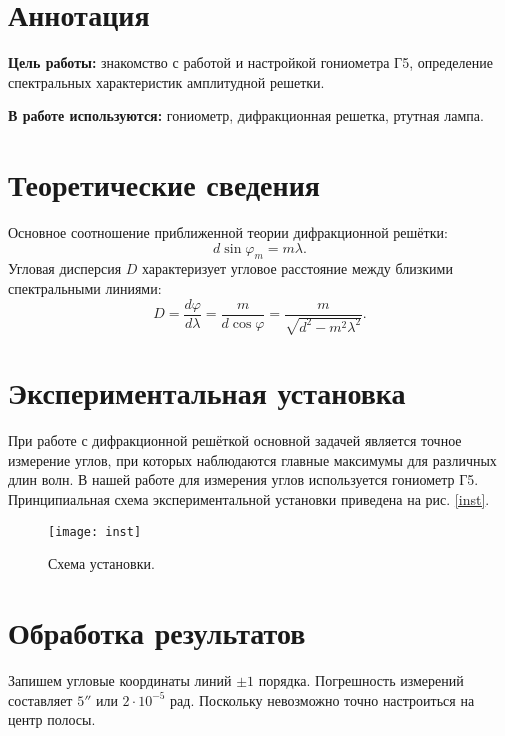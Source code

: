 






\section{Аннотация}
\textbf{Цель работы:} знакомство с работой и настройкой гониометра Г5, определение спектральных характеристик амплитудной решетки.

\textbf{В работе используются:}  гониометр, дифракционная решетка, ртутная лампа.
\section{Теоретические сведения}
\noindent Основное соотношение приближенной теории дифракционной решётки:
\begin{equation}
d\sin \varphi_m = m\lambda.
\end{equation}
Угловая дисперсия $D$ характеризует угловое расстояние между близкими спектральными линиями:
\begin{equation}
D = \frac{d\varphi}{d\lambda} = \frac{m}{d \cos \varphi}=\frac{m}{\sqrt{d^{2}-m^{2} \lambda^{2}}}.
\end{equation}

\section{Экспериментальная установка}
При работе с дифракционной решёткой основной задачей является точное измерение углов, при которых наблюдаются главные максимумы для различных длин волн. В нашей работе для измерения углов используется гониометр Г5. Принципиальная схема экспериментальной установки приведена на рис. \ref{inst}.
\begin{figure}[H]
	\centering
	\texttt{[image: inst]}
	\caption{Схема установки.}
\end{figure}

\section{Обработка результатов}

	Запишем угловые координаты линий $\pm1$ порядка. Погрешность измерений составляет $5''$ или $2\cdot 10^{-5}$ рад. Поскольку невозможно точно настроиться на центр полосы.
	
